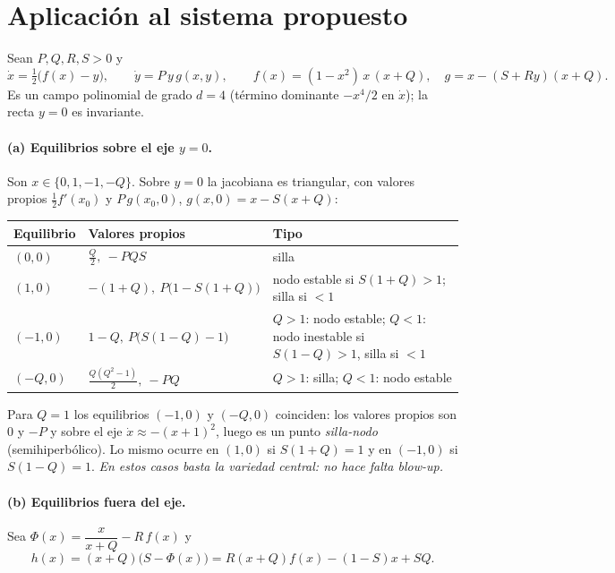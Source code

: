 \documentclass[11pt,a4paper,oneside]{book}
\theoremstyle{plain}
\theoremstyle{definition}
\theoremstyle{remark}
\begin{document}
\section{Aplicación al sistema propuesto}\label{sec:aplicacion}

Sean $P,Q,R,S>0$ y
\begin{equation}\label{eq:S}
\dot x=\tfrac12\big(f(x)-y\big),\qquad \dot y=P\,y\,g(x,y),\qquad
f(x)=(1-x^2)\,x\,(x+Q),\quad g=x-(S+Ry)(x+Q).
\end{equation}
Es un campo polinomial de grado $d=4$ (término dominante $-x^4/2$ en $\dot x$); la recta $y=0$ es invariante.

\paragraph{(a) Equilibrios sobre el eje $y=0$.} Son $x\in\{0,1,-1,-Q\}$. Sobre $y=0$ la jacobiana es triangular, con valores propios $\tfrac12f'(x_0)$ y $P\,g(x_0,0)$, $g(x,0)=x-S(x+Q)$:

\begin{center}
\begin{tabular}{@{}l l p{6.2cm}@{}}
\toprule
Equilibrio & Valores propios & Tipo \\
\midrule
$(0,0)$ & $\tfrac Q2,\ -PQS$ & silla \\
$(1,0)$ & $-(1+Q),\ P\big(1-S(1+Q)\big)$ & nodo estable si $S(1+Q)>1$; silla si $<1$ \\
$(-1,0)$ & $1-Q,\ P\big(S(1-Q)-1\big)$ & $Q>1$: nodo estable; $Q<1$: nodo inestable si $S(1-Q)>1$, silla si $<1$ \\
$(-Q,0)$ & $\tfrac{Q(Q^2-1)}2,\ -PQ$ & $Q>1$: silla; $Q<1$: nodo estable \\
\bottomrule
\end{tabular}
\end{center}

Para $Q=1$ los equilibrios $(-1,0)$ y $(-Q,0)$ coinciden: los valores propios son $0$ y $-P$ y sobre el eje $\dot x\approx-(x+1)^2$, luego es un punto \emph{silla-nodo} (semihiperbólico). Lo mismo ocurre en $(1,0)$ si $S(1+Q)=1$ y en $(-1,0)$ si $S(1-Q)=1$. \emph{En estos casos basta la variedad central: no hace falta blow-up.}

\paragraph{(b) Equilibrios fuera del eje.} Sea $\Phi(x)=\dfrac{x}{x+Q}-R\,f(x)$ y
\[
h(x)=(x+Q)\big(S-\Phi(x)\big)=R(x+Q)f(x)-(1-S)x+SQ .
\]
\end{document}
